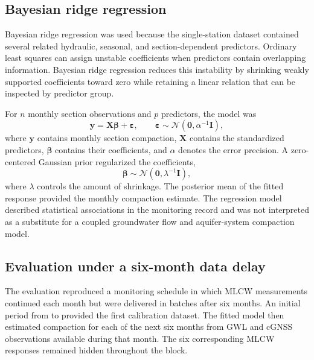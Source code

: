 \subsection{Bayesian ridge regression}
\label{subsec:bayesian_ridge}

Bayesian ridge regression was used because the single-station dataset contained several related hydraulic, seasonal, and section-dependent predictors. Ordinary least squares can assign unstable coefficients when predictors contain overlapping information. Bayesian ridge regression reduces this instability by shrinking weakly supported coefficients toward zero while retaining a linear relation that can be inspected by predictor group.

For $n$ monthly section observations and $p$ predictors, the model was
\begin{equation}
\boldsymbol{y}=\boldsymbol{X}\boldsymbol{\beta}+\boldsymbol{\varepsilon},
\qquad
\boldsymbol{\varepsilon}\sim\mathcal{N}(\boldsymbol{0},\alpha^{-1}\boldsymbol{I}),
\label{eq:brr_likelihood}
\end{equation}
where $\boldsymbol{y}$ contains monthly section compaction, $\boldsymbol{X}$ contains the standardized predictors, $\boldsymbol{\beta}$ contains their coefficients, and $\alpha$ denotes the error precision. A zero-centered Gaussian prior regularized the coefficients,
\begin{equation}
\boldsymbol{\beta}\sim\mathcal{N}(\boldsymbol{0},\lambda^{-1}\boldsymbol{I}),
\label{eq:brr_prior}
\end{equation}
where $\lambda$ controls the amount of shrinkage. The posterior mean of the fitted response provided the monthly compaction estimate. The regression model described statistical associations in the monitoring record and was not interpreted as a substitute for a coupled groundwater flow and aquifer-system compaction model.

\subsection{Evaluation under a six-month data delay}
\label{subsec:delayed_evaluation}

The evaluation reproduced a monitoring schedule in which MLCW measurements continued each month but were delivered in batches after six months. An initial period from  to  provided the first calibration dataset. The fitted model then estimated compaction for each of the next six months from GWL and cGNSS observations available during that month. The six corresponding MLCW responses remained hidden throughout the block.

